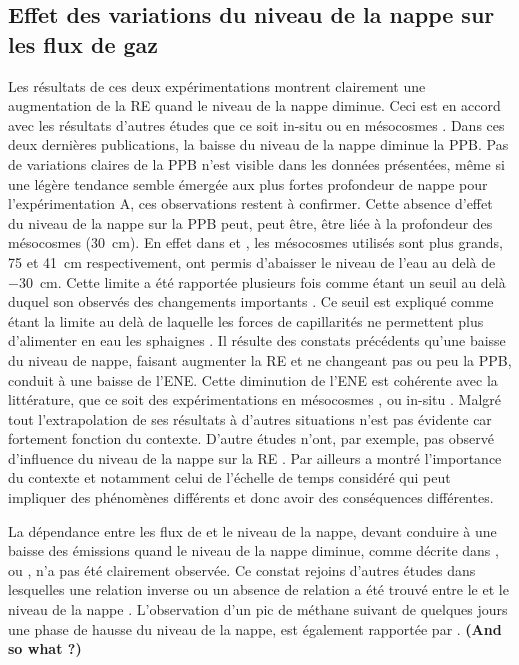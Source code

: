 \subsection{Effet des variations du niveau de la nappe sur les flux de gaz}

Les résultats de ces deux expérimentations montrent clairement une augmentation de la RE quand le niveau de la nappe diminue.
Ceci est en accord avec les résultats d'autres études que ce soit in-situ \citep{ballantyne2014} ou en mésocosmes \citep{blodau2004,dinsmore2009}.
Dans ces deux dernières publications, la baisse du niveau de la nappe diminue la PPB.
Pas de variations claires de la PPB n'est visible dans les données présentées, même si une légère tendance semble émergée aux plus fortes profondeur de nappe pour l'expérimentation A, ces observations restent à confirmer.
Cette absence d'effet du niveau de la nappe sur la PPB peut, peut être, être liée à la profondeur des mésocosmes (\SI{30}{\centi\metre}).
En effet dans \citet{blodau2004} et \citet{dinsmore2009}, les mésocosmes utilisés sont plus grands, 75 et \SI{41}{\centi\metre} respectivement, ont permis d'abaisser le niveau de l'eau au delà de \SI{-30}{\centi\metre}.
Cette limite a été rapportée plusieurs fois comme étant un seuil au delà duquel son observés des changements importants \citep{blodau2004,peichl2014}.
Ce seuil est expliqué comme étant la limite au delà de laquelle les forces de capillarités ne permettent plus d'alimenter en eau les sphaignes \citep{rydin2013a,ketcheson2014}.
Il résulte des constats précédents qu'une baisse du niveau de nappe, faisant augmenter la RE et ne changeant pas ou peu la PPB, conduit à une baisse de l'ENE.
Cette diminution de l'ENE est cohérente avec la littérature, que ce soit des expérimentations en mésocosmes \citep{aerts1997,blodau2004}, ou in-situ \citep{bubier2003,sonnentag2010}.
Malgré tout l'extrapolation de ses résultats à d'autres situations n'est pas évidente car fortement fonction du contexte.
D'autre études n'ont, par exemple, pas observé d'influence du niveau de la nappe sur la RE \citep{updegraff2001}.
Par ailleurs \citet{laiho2006} a montré l'importance du contexte et notamment celui de l'échelle de temps considéré qui peut impliquer des phénomènes différents et donc avoir des conséquences différentes.

La dépendance entre les flux de \chh et le niveau de la nappe, devant conduire à une baisse des émissions quand le niveau de la nappe diminue, comme décrite dans \citet{aerts1997}, \citet{pelletier2007} ou \citet{turetsky2008}, n'a pas été clairement observée.
Ce constat rejoins d'autres études dans lesquelles une relation inverse ou un absence de relation a été trouvé entre le \chh et le niveau de la nappe \citet{kettunen1996,bellisario1999,treat2007}.
L'observation d'un pic de méthane suivant de quelques jours une phase de hausse du niveau de la nappe, est également rapportée par \citet{kettunen1996}. \textbf{(And so what ?)}


